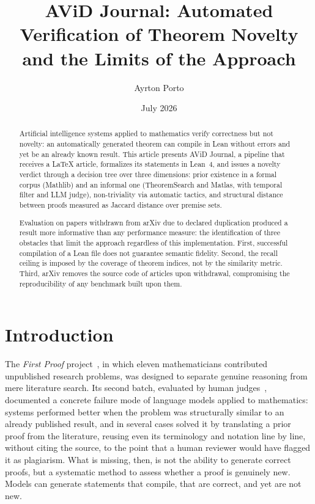 \documentclass[12pt,a4paper]{article}
\title{AViD Journal: Automated Verification of Theorem Novelty\\
and the Limits of the Approach}
\author{Ayrton Porto}
\date{July 2026}
\theoremstyle{remark}
\begin{document}
\maketitle


\begin{abstract}
Artificial intelligence systems applied to mathematics verify correctness but not novelty: an automatically generated theorem can compile in Lean without errors and yet be an already known result. This article presents AViD Journal, a pipeline that receives a LaTeX article, formalizes its statements in Lean~4, and issues a novelty verdict through a decision tree over three dimensions: prior existence in a formal corpus (Mathlib) and an informal one (TheoremSearch and Matlas, with temporal filter and LLM judge), non-triviality via automatic tactics, and structural distance between proofs measured as Jaccard distance over premise sets.

Evaluation on papers withdrawn from arXiv due to declared duplication produced a result more informative than any performance measure: the identification of three obstacles that limit the approach regardless of this implementation. First, successful compilation of a Lean file does not guarantee semantic fidelity. Second, the recall ceiling is imposed by the coverage of theorem indices, not by the similarity metric. Third, arXiv removes the source code of articles upon withdrawal, compromising the reproducibility of any benchmark built upon them.
\end{abstract}


\section{Introduction}

The \textit{First Proof} project~\cite{abouzaid2026}, in which eleven mathematicians contributed unpublished research problems, was designed to separate genuine reasoning from mere literature search. Its second batch, evaluated by human judges~\cite{firstproof2b}, documented a concrete failure mode of language models applied to mathematics: systems performed better when the problem was structurally similar to an already published result, and in several cases solved it by translating a prior proof from the literature, reusing even its terminology and notation line by line, without citing the source, to the point that a human reviewer would have flagged it as plagiarism. What is missing, then, is not the ability to generate correct proofs, but a systematic method to assess whether a proof is genuinely new. Models can generate statements that compile, that are correct, and yet are not new.
\end{document}
